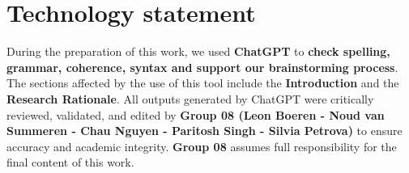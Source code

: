\documentclass[
]{article}
\begin{document}
\newpage{}

\section*{Technology statement}\label{technology-statement}

During the preparation of this work, we used \textbf{ChatGPT} to
\textbf{check spelling, grammar, coherence, syntax and support our
brainstorming process}. The sections affected by the use of this tool
include the \textbf{Introduction} and the \textbf{Research Rationale}.
All outputs generated by ChatGPT were critically reviewed, validated,
and edited by \textbf{Group 08 (Leon Boeren - Noud van Summeren - Chau
Nguyen - Paritosh Singh - Silvia Petrova)} to ensure accuracy and
academic integrity. \textbf{Group 08} assumes full responsibility for
the final content of this work.
\end{document}
